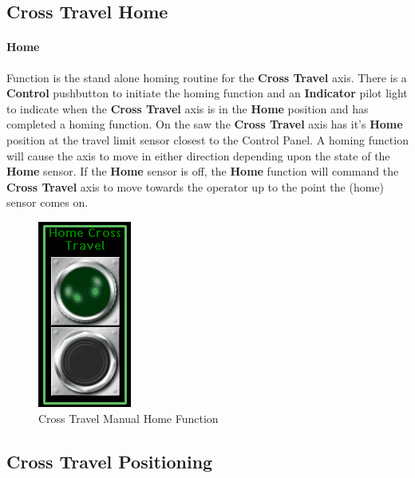 \subsection{Cross Travel Home}\paragraph*{Home}Function is the stand alone homing routine for the \textbf{Cross Travel} axis. There is a \textbf{Control} pushbutton to initiate the homing function and an \textbf{Indicator} pilot light to indicate when the \textbf{Cross Travel} axis is in the \textbf{Home} position and has completed a homing function. On the saw the \textbf{Cross Travel} axis has it's \textbf{Home} position at the travel limit sensor closest to the Control Panel. A homing function will cause the axis to move in either direction depending upon the state of the \textbf{Home} sensor. If the \textbf{Home} sensor is off, the \textbf{Home} function will command the \textbf{Cross Travel} axis to move towards the operator up to the point the (home) sensor comes on.
\begin{figure}
	\centering
	\includegraphics[width=.2\linewidth]{screen-captures/manual/trans-manual-home}
	\caption{Cross Travel Manual Home Function}
	\label{fig:cross-manual-home}
\end{figure}
\pagebreak
\subsection{Cross Travel Positioning}
